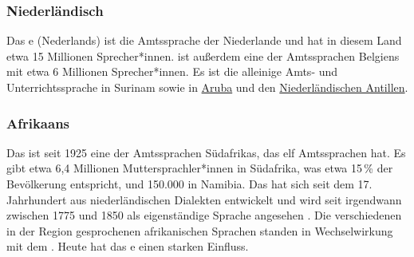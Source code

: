 \subsubsection{Niederländisch}

Das e (Nederlands) ist die Amtssprache der Niederlande und hat in diesem Land etwa 15 Millionen Sprecher*innen.  ist außerdem eine der Amtssprachen Belgiens mit etwa 6 Millionen Sprecher*innen.
Es ist die alleinige Amts- und Unterrichtssprache in Surinam
sowie in \href{https://en.wikipedia.org/wiki/Aruba}{Aruba} und den \href{https://en.wikipedia.org/wiki/Netherlands_Antilles}{Niederländischen Antillen}.


\subsubsection{Afrikaans}

Das  ist seit 1925 eine der Amtssprachen Südafrikas, das elf Amtssprachen hat.
Es gibt etwa 6,4 Millionen Muttersprachler*innen in Südafrika, was etwa 15\,\% der Bevölkerung entspricht,
und 150.000 in Namibia. Das  hat sich seit dem 17. Jahrhundert aus niederländischen Dialekten entwickelt und wird
seit irgendwann zwischen 1775 und 1850 als eigenständige Sprache angesehen
\citep[]{denBesten2012a-u}.
Die verschiedenen in der Region gesprochenen afrikanischen Sprachen standen in Wechselwirkung mit dem .
Heute hat das e einen starken Einfluss.



